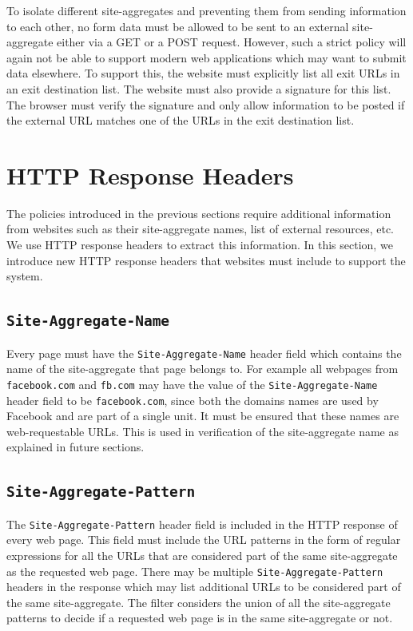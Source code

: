 To isolate different site-aggregates and preventing them from sending information to each other, no form data must be allowed to be sent to an external site-aggregate either via a GET or a POST request. However, such a strict policy will again not be able to support modern web applications which may want to submit data elsewhere. To support this, the website must explicitly list all exit URLs in an exit destination list. The website must also provide a signature for this list. The browser must verify the signature and only allow information to be posted if the external URL matches one of the URLs in the exit destination list.

\section{HTTP Response Headers}

The policies introduced in the previous sections require additional information from websites such as their site-aggregate names, list of external resources, etc. We use HTTP response headers to extract this information. In this section, we introduce new HTTP response headers that websites must include to support the system.

\subsection{\texttt{Site-Aggregate-Name}}

Every page must have the {\tt Site-Aggregate-Name} header field which contains the name of the site-aggregate that page belongs to. For example all webpages from {\tt facebook.com} and {\tt fb.com} may have the value of the {\tt Site-Aggregate-Name} header field to be {\tt facebook.com}, since both the domains names are used by Facebook and are part of a single unit. It must be ensured that these names are web-requestable URLs. This is used in verification of the site-aggregate name as explained in future sections.

\subsection{\texttt{Site-Aggregate-Pattern}}

The {\tt Site-Aggregate-Pattern} header field is included in the HTTP response of every web page. This field must include the URL patterns in the form of regular expressions for all the URLs that are considered part of the same site-aggregate as the requested web page. There may be multiple {\tt Site-Aggregate-Pattern} headers in the response which may list additional URLs to be considered part of the same site-aggregate. The filter considers the union of all the site-aggregate patterns to decide if a requested web page is in the same site-aggregate or not.

